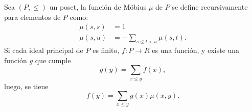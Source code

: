 Sea $(P, \leq)$ un poset, la función de Möbius $\mu$ de $P$ se define recursivamente para elementos de $P$ como:
\begin{align*}
	\mu(s,s) &= 1\\
	\mu(s,u) &= -\sum_{s \leq t < u} \mu(s,t).
\end{align*}
Si cada ideal principal de $P$ es finito, $f \colon P \to R$ es una función, y existe una función $g$ que cumple
\[
	g(y) = \sum_{x \leq y} f(x),
\]
luego, se tiene
\[
	f(y) = \sum_{x \leq y} g(x) \mu(x,y).
\]
